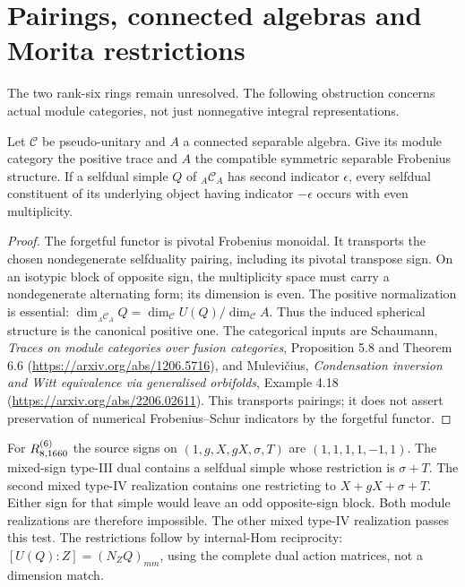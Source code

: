 \section{Pairings, connected algebras and Morita restrictions}
\label{sec:pairing-morita-20261027}
The two rank-six rings remain unresolved. The following obstruction concerns
actual module categories, not just nonnegative integral representations.

\begin{lemma}
Let $\mathcal C$ be pseudo-unitary and $A$ a connected separable algebra.
Give its module category the positive trace and $A$ the compatible symmetric
separable Frobenius structure. If a selfdual simple $Q$ of
${}_A\mathcal C_A$ has second indicator $\epsilon$, every selfdual
constituent of its underlying object having indicator $-\epsilon$ occurs
with even multiplicity.
\end{lemma}
\begin{proof}
The forgetful functor is pivotal Frobenius monoidal. It transports the
chosen nondegenerate selfduality pairing, including its pivotal transpose
sign. On an isotypic block of opposite sign, the multiplicity space must
carry a nondegenerate alternating form; its dimension is even.
The positive normalization is essential:
$\dim_{{}_A\mathcal C_A}Q=\dim_{\mathcal C}U(Q)/\dim_{\mathcal C}A$.
Thus the induced spherical structure is the canonical positive one.
The categorical inputs are Schaumann, \emph{Traces on module categories
over fusion categories}, Proposition 5.8 and Theorem 6.6
(\url{https://arxiv.org/abs/1206.5716}), and Mulevi\v cius,
\emph{Condensation inversion and Witt equivalence via generalised orbifolds},
Example 4.18 (\url{https://arxiv.org/abs/2206.02611}).
This transports pairings; it does not assert preservation of numerical
Frobenius--Schur indicators by the forgetful functor.
\end{proof}

For $R^{(6)}_{8,1660}$ the source signs on $(1,g,X,gX,\sigma,T)$ are
$(1,1,1,1,-1,1)$. The mixed-sign type-III dual contains a selfdual simple
whose restriction is $\sigma+T$. The second mixed type-IV realization
contains one restricting to $X+gX+\sigma+T$. Either sign for that simple
would leave an odd opposite-sign block. Both module realizations are
therefore impossible. The other mixed type-IV realization passes this test.
The restrictions follow by internal-Hom reciprocity:
$[U(Q):Z]=(N_ZQ)_{mm}$, using the complete dual action matrices, not a
dimension match.


